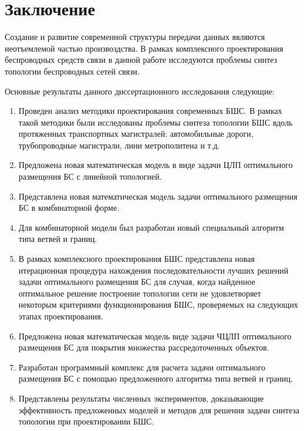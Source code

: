 \chapter*{Заключение}                       %
Создание и развитие современной структуры передачи данных являются неотъемлемой частью произвоздства. В рамках комплексного проектирования беспроводных средств связи в данной работе исследуются проблемы синтез топологии беспроводных сетей связи.

Основные результаты данного диссертационного исследования следующие:
\begin{enumerate}
    \item Проведен анализ методики проектирования современных БШС. В рамках такой методики были исследованы проблемы синтеза топологии БШС вдоль протяженных транспортных магистралей: автомобильные дороги, трубопроводные магистрали, лини метрополитена и т.д. 
    \item Предложена новая математическая модель в виде задачи ЦЛП оптимального размещения БС с линейной топологией.
    \item Представлена новая математическая модель задачи оптимального размещения БС в комбинаторной форме. 
    \item Для комбинаторной модели был разработан новый специальный алгоритм типа ветвей и границ. 
    
    \item В рамках комплексного проектирования БШС представлена новая итерационная процедура нахождения последовательности лучших решений задачи оптимального размещения БС для случая, когда найденное оптимальное решение построение топологии сети не удовлетворяет некоторым критериями функционирования БШС, проверяемых на следующих этапах проектирования.
    \item Предложена новая математическая модель виде задачи ЧЦЛП оптимального размещения БС для покрытия множества рассредоточенных объектов. 
    \item Разработан программный комплекс для расчета задачи оптимального размещения БС  с помощью предложенного алгоритма типа ветвей и границ.
    \item Представлены результаты численных экспериментов, доказывающие эффективность предложенных моделей и методов для решения задачи синтеза топологии при проектировании БШС.
\end{enumerate}


